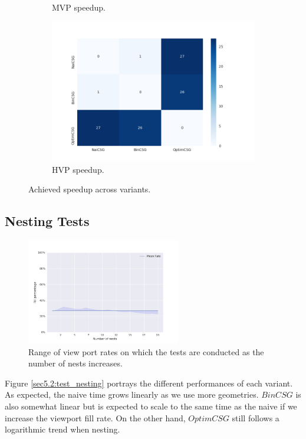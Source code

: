 \documentclass[a4paper,11pt,oneside]{article}
\begin{document}
\begin{figure}[ht]
\begin{subfigure}[b]{0.3\textwidth}
		\caption{MVP speedup.}
		\label{sec5:speedup-mvp}
	\end{subfigure}
	\begin{subfigure}[b]{0.3\textwidth}
		\centering
		\includegraphics[width=\linewidth]{section5/plots/speedup_hvp.png}
		\caption{HVP speedup.}
		\label{sec5:speedup-hvp}
	\end{subfigure}
	\caption{Achieved speedup across variants.}
	\label{sec5:speedup}
\end{figure}


\subsection{Nesting Tests}


\begin{figure}[H]
	\centering
	\includegraphics[width=0.6\textwidth]{section5/plots/test_nesting_rates.png}
	\caption{Range of view port rates on which the tests are conducted as the number of nests increases.}
	\label{sec5.2:test_nesting_rates}
\end{figure}


Figure \ref{sec5.2:test_nesting} portrays the different performances of each variant. As expected, the naive time grows linearly as we use more geometries. $BinCSG$ is also somewhat linear but is expected to scale to the same time as the naive if we increase the viewport fill rate. On the other hand, $OptimCSG$ still follows a logarithmic trend when nesting.
\end{document}
